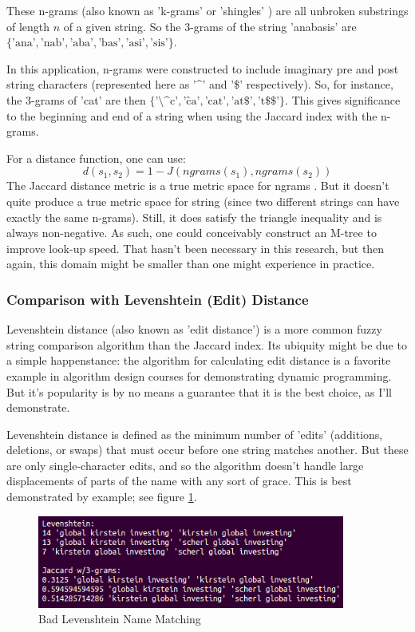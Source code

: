 \documentclass[11pt]{article}
\begin{document}
These n-grams (also known as 'k-grams' or 'shingles' \cite{mining}) are all unbroken substrings of 
length $n$ of a given string. So the 3-grams of the string 'anabasis' are 
$\{\text{'ana'}, \text{'nab'}, \text{'aba'}, \text{'bas'}, \text{'asi'}, \text{'sis'}\}$. 

In this application, n-grams were constructed to include imaginary pre and post string characters
(represented here as '\^{}' and '\$' respectively). So, for instance, the 3-grams of 'cat' are then
$\{\text{'\^{}\^{}c'}, \text{'\^{}ca'}, \text{'cat'}, \text{'at\$'}, \text{'t\$\$'}\}$. This gives
significance to the beginning and end of a string when using the Jaccard index with the n-grams.

For a distance function, one can use:
\[d(s_1,s_2) = 1-J(ngrams(s_1),ngrams(s_2))\]
The Jaccard distance metric is a true metric space for ngrams \cite{data_mining}.
But it doesn't quite produce a true metric space for string
(since two different strings can have exactly the same n-grams). Still, it does satisfy
the triangle inequality \cite{general} and is always non-negative. As such, one could
conceivably construct an M-tree \cite{mtree} to improve look-up speed. 
That hasn't been necessary in this research, but then again, this domain might be smaller
than one might experience in practice.

\subsubsection{Comparison with Levenshtein (Edit) Distance}
Levenshtein distance (also known as 'edit distance') is a more common fuzzy string comparison algorithm
than the Jaccard index. 
Its ubiquity might be due to a simple happenstance: the algorithm for calculating edit distance is
a favorite example in algorithm design courses for demonstrating dynamic programming.
But it's popularity is by no means a guarantee that it is the best choice, as I'll demonstrate.

Levenshtein distance is defined as \cite{levenshtein} the minimum number of 'edits' 
(additions, deletions, or swaps) that must occur before one string matches another.
But these are only single-character edits, and so the algorithm doesn't handle large displacements
of parts of the name with any sort of grace.
This is best demonstrated by example; see figure \ref{fig:lev_comp}.

\begin{figure}[h!]
    \centering
    \includegraphics[width=0.9\textwidth,natwidth=1,natheight=1]{imgs/levenshtein_comp.png}
    \caption{Bad Levenshtein Name Matching}
    \label{fig:lev_comp}
\end{figure}
\end{document}
